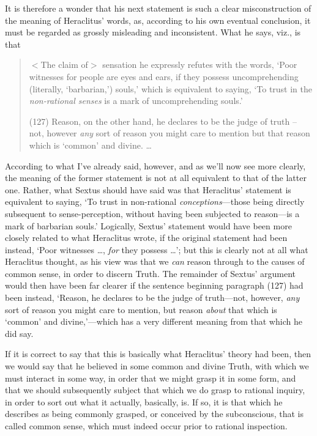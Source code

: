 It is therefore a wonder that his next statement is such a clear misconstruction of the meaning of Heraclitus' words, as, according to his own eventual conclusion, it must be regarded as grossly misleading and inconsistent. What he says, viz., is that \cite{Robinson1987}
\begin{quotation}
\noindent$<$The claim of$>$ sensation he expressly refutes with the words, `Poor witnesses for people are eyes and ears, if they possess uncomprehending (literally, `barbarian,') souls,' which is equivalent to saying, `To trust in the \textit{non-rational senses} is a mark of uncomprehending souls.'

(127) Reason, on the other hand, he declares to be the judge of truth -- not, however \textit{any} sort of reason you might care to mention but that reason which is `common' and divine. \ldots
\end{quotation}
According to what I've already said, however, and as we'll now see more clearly, the meaning of the former statement is not at all equivalent to that of the latter one. Rather, what Sextus should have said was that Heraclitus' statement is equivalent to saying, `To trust in non-rational \textit{conceptions}---those being directly subsequent to sense-perception, without having been subjected to reason---is a mark of barbarian souls.' Logically, Sextus' statement would have been more closely related to what Heraclitus wrote, if the original statement had been instead, `Poor witnesses \ldots, \textit{for} they possess \ldots'; but this is clearly not at all what Heraclitus thought, as his view was that we \textit{can} reason through to the causes of common sense, in order to discern Truth. The remainder of Sextus' argument would then have been far clearer if the sentence beginning paragraph (127) had been instead, `Reason, he declares to be the judge of truth---not, however, \textit{any} sort of reason you might care to mention, but reason \textit{about} that which is `common' and divine,'---which has a very different meaning from that which he did say. 

If it is correct to say that this is basically what Heraclitus' theory had been, then we would say that he believed in some common and divine Truth, with which we must interact in some way, in order that we might grasp it in some form, and that we should subsequently subject that which we do grasp to rational inquiry, in order to sort out what it actually, basically, is. If so, it is that which he describes as being commonly grasped, or conceived by the subconscious, that is called common sense, which must indeed occur prior to rational inspection.

